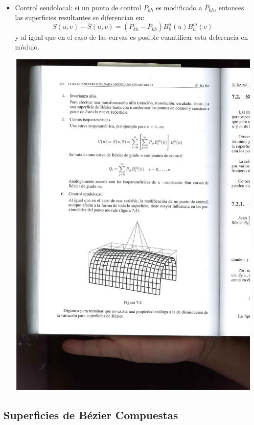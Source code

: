 \documentclass[ebook,oneside]{memoir}
\begin{document}
\begin{itemize}
\item Control seudolocal: si un punto de control $P_{kh}$ es modificado a $\overline{P}_{kh}$, entonces las superficies resultantes se diferencian en:
    $$S(u,v)-\overline{S}(u,v)=(P_{kh}-\overline{P}_{kh})B_k^n(u)B_h^m(v)$$
    y al igual que en el caso de las curvas es posible cuantificar esta deferencia en m\'{o}dulo.

\begin{center}
\includegraphics[scale=0.45]{7_4.pdf}
\end{center}
\end{itemize}

\subsection{Superficies de B\'{e}zier Compuestas}
\end{document}
